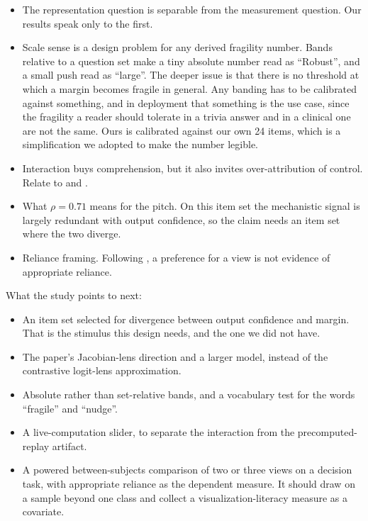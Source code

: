 \documentclass[sigconf]{acmart}
\newcommand{\guideline}[1]{\textit{\color{paperblue}{#1}}}
\begin{document}
\guideline{Outline. Because this is a course project, substantial future work is acceptable.}
\begin{itemize}
  \item The representation question is separable from the measurement question. Our results speak only to the
    first.
  \item Scale sense is a design problem for any derived fragility number. Bands relative to a question set make
    a tiny absolute number read as ``Robust'', and a small push read as ``large''. The deeper issue is that
    there is no threshold at which a margin becomes fragile in general. Any banding has to be calibrated
    against something, and in deployment that something is the use case, since the fragility a reader should
    tolerate in a trivia answer and in a clinical one are not the same. Ours is calibrated against our own 24
    items, which is a simplification we adopted to make the number legible.
  \item Interaction buys comprehension, but it also invites over-attribution of control. Relate to
    \citet{chengExplainingDecisionMakingAlgorithms2019} and \citet{boSteerableChatbotsExploring2025}.
  \item What $\rho = 0.71$ means for the pitch. On this item set the mechanistic signal is largely redundant
    with output confidence, so the claim needs an item set where the two diverge.
  \item Reliance framing. Following \citet{boRelyNotRely2024}, a preference for a view is not evidence of
    appropriate reliance.
\end{itemize}

\noindent What the study points to next:

\begin{itemize}
  \item An item set selected for divergence between output confidence and margin. That is the stimulus this
    design needs, and the one we did not have.
  \item The paper's Jacobian-lens direction and a larger model, instead of the contrastive logit-lens
    approximation.
  \item Absolute rather than set-relative bands, and a vocabulary test for the words ``fragile'' and ``nudge''.
  \item A live-computation slider, to separate the interaction from the precomputed-replay artifact.
  \item A powered between-subjects comparison of two or three views on a decision task, with appropriate
    reliance as the dependent measure. It should draw on a sample beyond one class and collect a
    visualization-literacy measure as a covariate.
\end{itemize}
\end{document}
